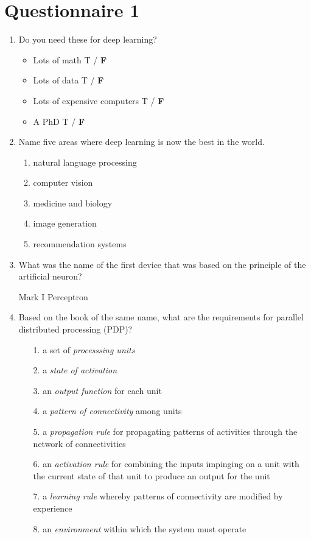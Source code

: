 \documentclass[12pt,a4paper]{article}
\begin{document}
\raggedright

\section*{Questionnaire 1}

\begin{enumerate}
\item Do you need these for deep learning?
\begin{itemize}
	\item Lots of math T / \textbf{F}
	\item Lots of data T / \textbf{F}
	\item Lots of expensive computers T / \textbf{F}
	\item A PhD T / \textbf{F}
\end{itemize}

\item Name five areas where deep learning is now the best in the world. \\

\begin{enumerate}
	\item natural language processing
	\item computer vision
	\item medicine and biology
	\item image generation
	\item recommendation systems
\end{enumerate}

\item What was the name of the first device that was based on the principle of the artificial neuron? \\

\smallbreak

Mark I Perceptron

\bigbreak

\item Based on the book of the same name, what are the requirements for parallel distributed processing (PDP)? \\

\begin{itemize}
	\item[1.] a set of \textit{processsing units}
	\item[2.] a \textit{state of activation}
	\item[3.] an \textit{output function} for each unit
	\item[4.] a \textit{pattern of connectivity} among units
	\item[5.] a \textit{propagation rule} for propagating patterns of activities through the network of connectivities
	\item[6.] an \textit{activation rule} for combining the inputs impinging on a unit with the current state of that unit to produce an output for the unit
	\item[7.] a \textit{learning rule} whereby patterns of connectivity are modified by experience
	\item[8.] an \textit{environment} within which the system must operate
\end{itemize}


\end{enumerate}
\end{document}

